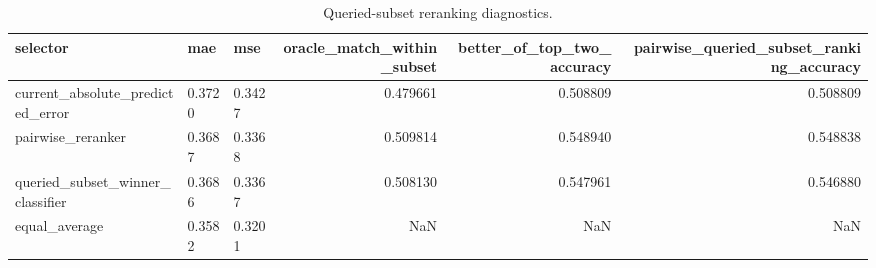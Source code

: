 \begin{table}
\caption{Queried-subset reranking diagnostics.}
\label{tab:costarts-reranking}
\begin{tabular}{lllrrr}
\toprule
selector & mae & mse & oracle\_match\_within\_subset & better\_of\_top\_two\_accuracy & pairwise\_queried\_subset\_ranking\_accuracy \\
\midrule
current\_absolute\_predicted\_error & 0.3720 & 0.3427 & 0.479661 & 0.508809 & 0.508809 \\
pairwise\_reranker & 0.3687 & 0.3368 & 0.509814 & 0.548940 & 0.548838 \\
queried\_subset\_winner\_classifier & 0.3686 & 0.3367 & 0.508130 & 0.547961 & 0.546880 \\
equal\_average & 0.3582 & 0.3201 & NaN & NaN & NaN \\
\bottomrule
\end{tabular}
\end{table}
